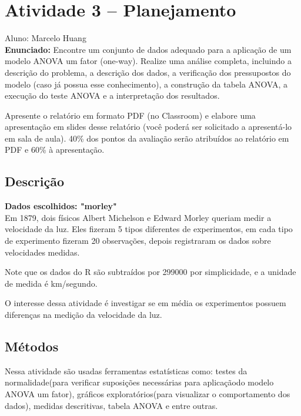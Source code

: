 \documentclass[12pt]{article}
\begin{document}
\section*{Atividade 3 -- Planejamento}
Aluno: Marcelo Huang\\

\textbf{Enunciado:}  
Encontre um conjunto de dados adequado para a aplicação de um modelo ANOVA um fator (one-way).
Realize uma análise completa, incluindo a descrição do problema, a descrição dos dados,
 a verificação dos pressupostos do modelo (caso já possua esse conhecimento), 
 a construção da tabela ANOVA, 
 a execução do teste ANOVA 
 e a interpretação dos resultados.

Apresente o relatório em formato PDF (no Classroom) 
e elabore uma apresentação em slides desse relatório 
(você poderá ser solicitado a apresentá-lo em sala de aula). 
40\% dos pontos da avaliação serão atribuídos ao relatório em PDF e 60\% à apresentação.

\subsection*{Descrição}

\textbf{ Dados escolhidos: "morley"}
\\

Em 1879, dois físicos Albert Michelson e Edward Morley queriam medir a velocidade da luz.
Eles fizeram 5 tipos diferentes de experimentos, em cada tipo de experimento fizeram 
20 observações, depois registraram os dados sobre velocidades medidas.

Note que os dados do R são subtraídos por 299000 por simplicidade,
 e a unidade de medida é km/segundo.

O interesse dessa atividade é investigar se em média os experimentos possuem diferenças 
na medição da velocidade da luz.

\subsection*{Métodos}

Nessa atividade são usadas ferramentas estatísticas como: testes da normalidade(para verificar suposições necessárias 
para aplicaçãodo modelo ANOVA um fator),
gráficos exploratórios(para visualizar o comportamento dos dados),
medidas descritivas, tabela ANOVA e entre outras.
\end{document}

